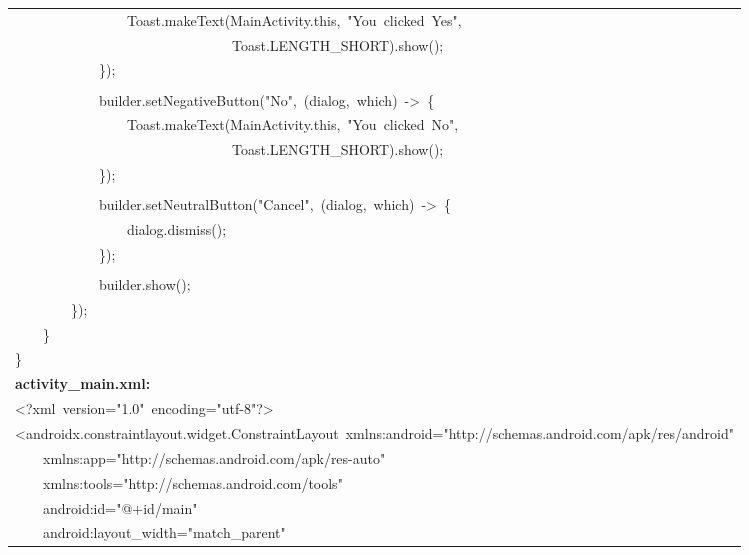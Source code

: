 \documentclass[a4paper,12pt]{article}
\begin{document}
\begin{longtable}{|p{}|}
{\ttfamily\small \ \ \ \ \ \ \ \ \ \ \ \ \ \ \ \ Toast.makeText(MainActivity.this,\ "You\ clicked\ Yes",\ } \\
{\ttfamily\small \ \ \ \ \ \ \ \ \ \ \ \ \ \ \ \ \ \ \ \ \ \ \ \ \ \ \ \ \ \ \ Toast.LENGTH\_SHORT).show();} \\
{\ttfamily\small \ \ \ \ \ \ \ \ \ \ \ \ \});} \\
\strut \\
{\ttfamily\small \ \ \ \ \ \ \ \ \ \ \ \ builder.setNegativeButton("No",\ (dialog,\ which)\ -\textgreater{}\ \{} \\
{\ttfamily\small \ \ \ \ \ \ \ \ \ \ \ \ \ \ \ \ Toast.makeText(MainActivity.this,\ "You\ clicked\ No",\ } \\
{\ttfamily\small \ \ \ \ \ \ \ \ \ \ \ \ \ \ \ \ \ \ \ \ \ \ \ \ \ \ \ \ \ \ \ Toast.LENGTH\_SHORT).show();} \\
{\ttfamily\small \ \ \ \ \ \ \ \ \ \ \ \ \});} \\
\strut \\
{\ttfamily\small \ \ \ \ \ \ \ \ \ \ \ \ builder.setNeutralButton("Cancel",\ (dialog,\ which)\ -\textgreater{}\ \{} \\
{\ttfamily\small \ \ \ \ \ \ \ \ \ \ \ \ \ \ \ \ dialog.dismiss();} \\
{\ttfamily\small \ \ \ \ \ \ \ \ \ \ \ \ \});} \\
\strut \\
{\ttfamily\small \ \ \ \ \ \ \ \ \ \ \ \ builder.show();} \\
{\ttfamily\small \ \ \ \ \ \ \ \ \});} \\
{\ttfamily\small \ \ \ \ \}} \\
{\ttfamily\small \}} \\
\hline
\rule{0pt}{13pt}\textbf{activity\_main.xml:} \\
\hline
{\ttfamily\small \textless{}?xml\ version="1.0"\ encoding="utf-8"?\textgreater{}} \\
{\ttfamily\small \textless{}androidx.constraintlayout.widget.ConstraintLayout\ xmlns:android="http://schemas.android.com/apk/res/android"} \\
{\ttfamily\small \ \ \ \ xmlns:app="http://schemas.android.com/apk/res-auto"} \\
{\ttfamily\small \ \ \ \ xmlns:tools="http://schemas.android.com/tools"} \\
{\ttfamily\small \ \ \ \ android:id="@+id/main"} \\
{\ttfamily\small \ \ \ \ android:layout\_width="match\_parent"} \\

\end{longtable}
\end{document}

